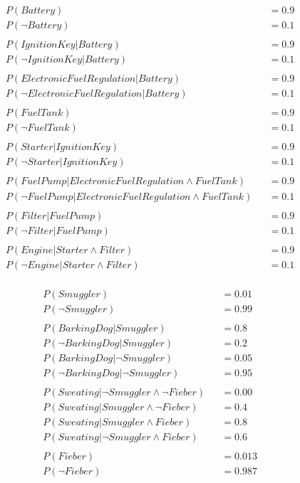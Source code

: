 \documentclass[ngerman]{fbi-aufgabenblatt}
\begin{document}
\begin{align*}
&P(Battery) &&= 0.9\\
&P(\neg Battery) &&= 0.1\\
&\\
&P(Ignition Key|Battery) &&= 0.9\\
&P(\neg Ignition Key| Battery) &&= 0.1\\
&\\
&P(Electronic Fuel Regulation|Battery) &&= 0.9\\
&P(\neg Electronic Fuel Regulation| Battery) &&= 0.1\\
&\\
&P(Fuel Tank) &&= 0.9\\
&P(\neg Fuel Tank) &&= 0.1\\
&\\
&P(Starter| Ignition Key) &&= 0.9\\
&P(\neg Starter | Ignition Key) &&= 0.1\\
&\\
&P(Fuel Pump | Electronic Fuel Regulation \land Fuel Tank) &&= 0.9\\
&P(\neg Fuel Pump | Electronic Fuel Regulation \land Fuel Tank) &&= 0.1\\
&\\
&P(Filter | Fuel Pump) &&= 0.9\\
&P(\neg Filter | Fuel Pump) &&= 0.1\\
&\\
&P(Engine | Starter \land Filter) &&= 0.9\\
&P(\neg Engine | Starter \land Filter) &&= 0.1\\
\end{align*}



\begin{align*}
&P(Smuggler) &&= 0.01\\
&P(\neg Smuggler) &&= 0.99\\
&\\
&P(BarkingDog | Smuggler) &&= 0.8\\
&P(\neg BarkingDog | Smuggler) &&= 0.2\\
&P(BarkingDog | \neg Smuggler) &&= 0.05\\
&P(\neg BarkingDog | \neg Smuggler) &&= 0.95\\
&\\
&P(Sweating | \neg Smuggler \land  \neg Fieber) &&= 0.00\\
&P(Sweating |  Smuggler \land \neg Fieber) &&= 0.4\\
&P(Sweating |  Smuggler \land Fieber) &&= 0.8\\
&P(Sweating |  \neg Smuggler \land Fieber) &&= 0.6\\
&\\
&P(Fieber) &&= 0.013\\
&P(\neg Fieber) &&= 0.987\\
\end{align*}
\end{document}
